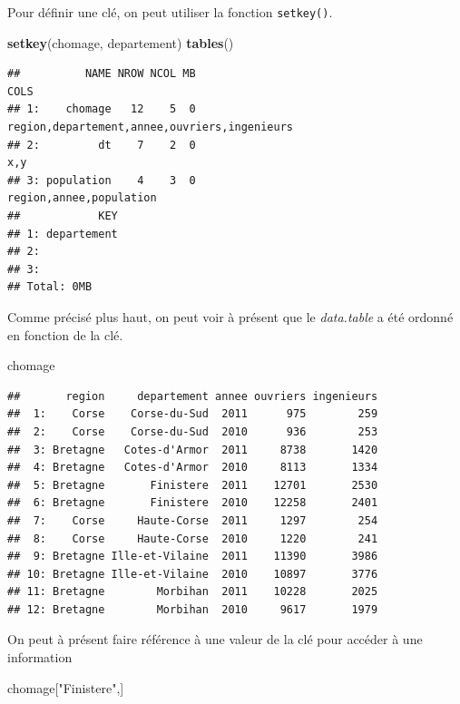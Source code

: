 \documentclass[
  11pt,
]{book}
\newenvironment{Shaded}{\begin{snugshade}}{\end{snugshade}}
\newcommand{\KeywordTok}[1]{\textcolor[rgb]{0.13,0.29,0.53}{\textbf{#1}}}
\newcommand{\NormalTok}[1]{#1}
\newcommand{\StringTok}[1]{\textcolor[rgb]{0.31,0.60,0.02}{#1}}
\numberwithin{equation}{section}
\numberwithin{countremarque}{section}
\begin{document}
Pour définir une clé, on peut utiliser la fonction \texttt{setkey()}.

\begin{Shaded}
\begin{Highlighting}[]
\KeywordTok{setkey}\NormalTok{(chomage, departement)}
\KeywordTok{tables}\NormalTok{()}
\end{Highlighting}
\end{Shaded}

\begin{lstlisting}
##          NAME NROW NCOL MB                                         COLS
## 1:    chomage   12    5  0 region,departement,annee,ouvriers,ingenieurs
## 2:         dt    7    2  0                                          x,y
## 3: population    4    3  0                      region,annee,population
##            KEY
## 1: departement
## 2:            
## 3:            
## Total: 0MB
\end{lstlisting}

Comme précisé plus haut, on peut voir à présent que le \emph{data.table} a été ordonné en fonction de la clé.

\begin{Shaded}
\begin{Highlighting}[]
\NormalTok{chomage}
\end{Highlighting}
\end{Shaded}

\begin{lstlisting}
##       region     departement annee ouvriers ingenieurs
##  1:    Corse    Corse-du-Sud  2011      975        259
##  2:    Corse    Corse-du-Sud  2010      936        253
##  3: Bretagne   Cotes-d'Armor  2011     8738       1420
##  4: Bretagne   Cotes-d'Armor  2010     8113       1334
##  5: Bretagne       Finistere  2011    12701       2530
##  6: Bretagne       Finistere  2010    12258       2401
##  7:    Corse     Haute-Corse  2011     1297        254
##  8:    Corse     Haute-Corse  2010     1220        241
##  9: Bretagne Ille-et-Vilaine  2011    11390       3986
## 10: Bretagne Ille-et-Vilaine  2010    10897       3776
## 11: Bretagne        Morbihan  2011    10228       2025
## 12: Bretagne        Morbihan  2010     9617       1979
\end{lstlisting}

On peut à présent faire référence à une valeur de la clé pour accéder à une information

\begin{Shaded}
\begin{Highlighting}[]
\NormalTok{chomage[}\StringTok{"Finistere"}\NormalTok{,]}
\end{Highlighting}
\end{Shaded}
\end{document}
